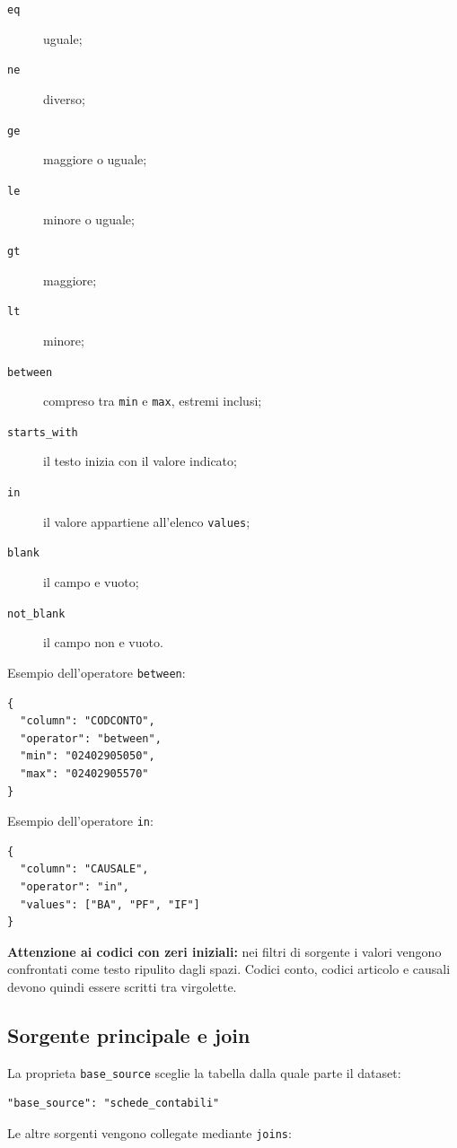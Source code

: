 \begin{description}
  \item[\texttt{eq}] uguale;
  \item[\texttt{ne}] diverso;
  \item[\texttt{ge}] maggiore o uguale;
  \item[\texttt{le}] minore o uguale;
  \item[\texttt{gt}] maggiore;
  \item[\texttt{lt}] minore;
  \item[\texttt{between}] compreso tra \texttt{min} e \texttt{max}, estremi
        inclusi;
  \item[\texttt{starts\_with}] il testo inizia con il valore indicato;
  \item[\texttt{in}] il valore appartiene all'elenco \texttt{values};
  \item[\texttt{blank}] il campo e vuoto;
  \item[\texttt{not\_blank}] il campo non e vuoto.
\end{description}

Esempio dell'operatore \texttt{between}:

\begin{lstlisting}
{
  "column": "CODCONTO",
  "operator": "between",
  "min": "02402905050",
  "max": "02402905570"
}
\end{lstlisting}

Esempio dell'operatore \texttt{in}:

\begin{lstlisting}
{
  "column": "CAUSALE",
  "operator": "in",
  "values": ["BA", "PF", "IF"]
}
\end{lstlisting}

\textbf{Attenzione ai codici con zeri iniziali:} nei filtri di sorgente i
valori vengono confrontati come testo ripulito dagli spazi. Codici conto,
codici articolo e causali devono quindi essere scritti tra virgolette.

\subsection{Sorgente principale e join}

La proprieta \texttt{base\_source} sceglie la tabella dalla quale parte il
dataset:

\begin{lstlisting}
"base_source": "schede_contabili"
\end{lstlisting}

Le altre sorgenti vengono collegate mediante \texttt{joins}:

